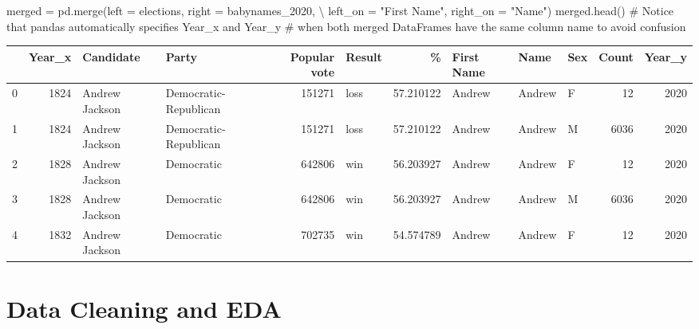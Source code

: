 \documentclass[
  letterpaper,
  DIV=11,
  numbers=noendperiod]{scrreprt}
\newenvironment{Shaded}{\begin{snugshade}}{\end{snugshade}}
\newcommand{\CommentTok}[1]{\textcolor[rgb]{0.37,0.37,0.37}{#1}}
\newcommand{\NormalTok}[1]{\textcolor[rgb]{0.00,0.23,0.31}{#1}}
\newcommand{\OperatorTok}[1]{\textcolor[rgb]{0.37,0.37,0.37}{#1}}
\newcommand{\StringTok}[1]{\textcolor[rgb]{0.13,0.47,0.30}{#1}}
\begin{document}
\begin{Shaded}
\begin{Highlighting}[]
\NormalTok{merged }\OperatorTok{=}\NormalTok{ pd.merge(left }\OperatorTok{=}\NormalTok{ elections, right }\OperatorTok{=}\NormalTok{ babynames\_2020, }\OperatorTok{\textbackslash{}}
\NormalTok{                  left\_on }\OperatorTok{=} \StringTok{"First Name"}\NormalTok{, right\_on }\OperatorTok{=} \StringTok{"Name"}\NormalTok{)}
\NormalTok{merged.head()}
\CommentTok{\# Notice that pandas automatically specifies \textasciigrave{}Year\_x\textasciigrave{} and \textasciigrave{}Year\_y\textasciigrave{} }
\CommentTok{\# when both merged DataFrames have the same column name to avoid confusion}
\end{Highlighting}
\end{Shaded}

\begin{tabular}{lrllrlrlllrr}
\toprule
{} &  Year\_x &       Candidate &                  Party &  Popular vote & Result &          \% & First Name &    Name & Sex &  Count &  Year\_y \\
\midrule
0 &    1824 &  Andrew Jackson &  Democratic-Republican &        151271 &   loss &  57.210122 &     Andrew &  Andrew &   F &     12 &    2020 \\
1 &    1824 &  Andrew Jackson &  Democratic-Republican &        151271 &   loss &  57.210122 &     Andrew &  Andrew &   M &   6036 &    2020 \\
2 &    1828 &  Andrew Jackson &             Democratic &        642806 &    win &  56.203927 &     Andrew &  Andrew &   F &     12 &    2020 \\
3 &    1828 &  Andrew Jackson &             Democratic &        642806 &    win &  56.203927 &     Andrew &  Andrew &   M &   6036 &    2020 \\
4 &    1832 &  Andrew Jackson &             Democratic &        702735 &    win &  54.574789 &     Andrew &  Andrew &   F &     12 &    2020 \\
\bottomrule
\end{tabular}


\hypertarget{data-cleaning-and-eda}{%
\chapter{Data Cleaning and EDA}\label{data-cleaning-and-eda}}
\end{document}
